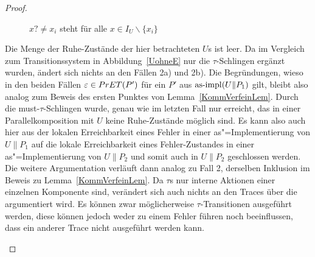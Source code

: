 \begin{proof}
\begin{itemize}
\begin{figure} [h!tbp]
\begin{center}
        \caption{$x?\neq x_i$ steht für alle $x\in I_U\backslash\{x_i\}$}
      \label{UohneEmitTau}
      \end{center}
      \end{figure}
      Die Menge der Ruhe-Zustände der hier betrachteten $U$s ist leer. Da im
      Vergleich zum Transitionssystem in Abbildung~\ref{UohneE} nur die
      $\tau$-Schlingen ergänzt wurden, ändert sich nichts an den Fällen 2a) und
      2b). Die Begründungen, wieso in den beiden Fällen $\varepsilon\in PrET
      (P')$ für ein $P'$ aus $\mathrm{as}\text{-}\mathrm{impl} (U\|P_1)$ gilt, bleibt also analog zum
      Beweis des ersten Punktes von Lemma~\ref{KommVerfeinLem}. Durch die
      must-$\tau$-Schlingen wurde, genau wie im letzten Fall nur erreicht, das
      in einer Parallelkomposition mit $U$ keine Ruhe-Zustände möglich sind. Es
      kann also auch hier aus der lokalen Erreichbarkeit eines
      Fehler in einer as"=Implementierung von $U\|P_1$ auf die
      lokale Erreichbarkeit eines Fehler-Zustandes
      in einer as"=Implementierung von $U\|P_2$ und somit auch in $U\|P_2$
      geschlossen werden. Die weitere Argumentation verläuft dann analog zu
      Fall 2, derselben Inklusion im Beweis zu Lemma~\ref{KommVerfeinLem}. Da
      $\tau$s nur interne Aktionen einer einzelnen Komponente sind, verändert
      sich auch nichts an den Traces über die argumentiert wird. Es können zwar
      möglicherweise $\tau$-Transitionen ausgeführt werden, diese können jedoch
      weder zu einem Fehler führen noch beeinflussen, dass ein anderer Trace
      nicht ausgeführt werden kann.
  \end{itemize}


\end{proof}
